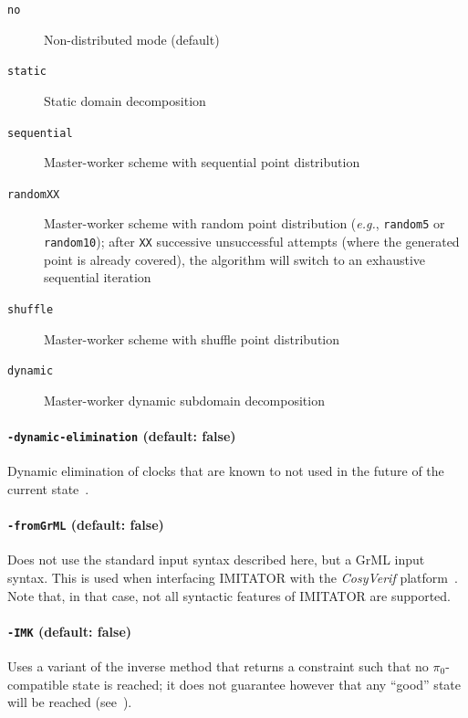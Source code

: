 \documentclass[a4paper,11pt]{report}
\newcommand{\pio}{\pi_0}
\newcommand{\CosyVerif}{\emph{CosyVerif}}
\newcommand{\imitator}{\textsf{IMITATOR}}
\newcommand{\styleOption}[1]{\textcolor{optioncolor}{\texttt{#1}}}
\newcommand{\eg}{\textcolor{colorok}{\textit{e.g.}, }}
\begin{document}
\begin{description}
	\item[\styleOption{no}] Non-distributed mode (default)
	\item[\styleOption{static}] Static domain decomposition \cite{ACN15}
	\item[\styleOption{sequential}] Master-worker scheme with sequential point distribution \cite{ACE14}
	\item[\styleOption{randomXX}] Master-worker scheme with random point distribution (\eg{} \styleOption{random5} or \styleOption{random10}); after \styleOption{XX} successive unsuccessful attempts (where the generated point is already covered), the algorithm will switch to an exhaustive sequential iteration \cite{ACE14}
	\item[\styleOption{shuffle}] Master-worker scheme with shuffle point distribution \cite{ACN15}
	\item[\styleOption{dynamic}] Master-worker dynamic subdomain decomposition \cite{ACN15}
\end{description}




\paragraph{\styleOption{-dynamic-elimination} (default: false)}
Dynamic elimination of clocks that are known to not used in the future of the current state~\cite{Andre13FSFMA}.




\paragraph{\styleOption{-fromGrML} (default: false)}

Does not use the standard input syntax described here, but a GrML input syntax.
This is used when interfacing \imitator{} with the \CosyVerif{} platform~\cite{AHHKLLP13}.
Note that, in that case, not all syntactic features of \imitator{} are supported.



\paragraph{\styleOption{-IMK} (default: false)}
Uses a variant of the inverse method that returns a constraint such that no $\pio$-compatible state is reached; it does not guarantee however that any ``good'' state will be reached (see~\cite{AS13}).
\end{document}
